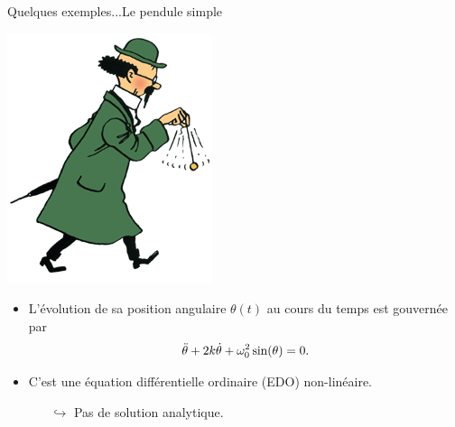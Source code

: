 \documentclass[usenames,dvipsnames,svgnames,10pt,aspectratio=169]{beamer}
\begin{document}
\begin{frame}[t, c]{Quelques exemples...}{Le pendule simple}
	\begin{minipage}{0.38\textwidth}
		\centering
		\includegraphics[width=.75\textwidth]{tournesol_pendule}
	\end{minipage}%
	\hfill
	\begin{minipage}{0.58\textwidth}
		\begin{itemize}
			\item L'évolution de sa position angulaire $\theta(t)$ au cours du temps est gouvernée par
					\begin{equation}
						\ddot{\theta} + 2k \dot{\theta} + \omega_0^2 \sin(\theta) = 0.
						\notag
					\end{equation}

			\item C'est une équation différentielle ordinaire (EDO) non-linéaire.
			\begin{itemize}
				\item[$\hookrightarrow$] Pas de solution analytique.
			\end{itemize}
		\end{itemize}

		\vspace{1cm}
	\end{minipage}
\end{frame}
\end{document}
